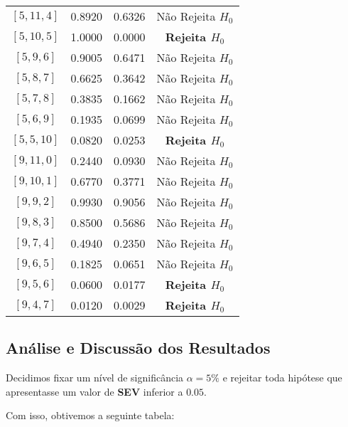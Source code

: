 \documentclass[12pt, a4paper]{article}
\begin{document}
\begin{table}[H]
\begin{tabular}{cccc}
        {$[5, 11, 4]$} & 0.8920 & 0.6326 & Não Rejeita $H_0$ \\
        {$[5, 10, 5]$} & 1.0000 & 0.0000 & \textbf{Rejeita $H_0$} \\
        {$[5, 9, 6]$}  & 0.9005 & 0.6471 & Não Rejeita $H_0$ \\
        {$[5, 8, 7]$}  & 0.6625 & 0.3642 & Não Rejeita $H_0$ \\
        {$[5, 7, 8]$}  & 0.3835 & 0.1662 & Não Rejeita $H_0$ \\
        {$[5, 6, 9]$}  & 0.1935 & 0.0699 & Não Rejeita $H_0$ \\
        {$[5, 5, 10]$} & 0.0820 & 0.0253 & \textbf{Rejeita $H_0$} \\
        \midrule
        {$[9, 11, 0]$} & 0.2440 & 0.0930 & Não Rejeita $H_0$ \\
        {$[9, 10, 1]$} & 0.6770 & 0.3771 & Não Rejeita $H_0$ \\
        {$[9, 9, 2]$}  & 0.9930 & 0.9056 & Não Rejeita $H_0$ \\
        {$[9, 8, 3]$}  & 0.8500 & 0.5686 & Não Rejeita $H_0$ \\
        {$[9, 7, 4]$}  & 0.4940 & 0.2350 & Não Rejeita $H_0$ \\
        {$[9, 6, 5]$}  & 0.1825 & 0.0651 & Não Rejeita $H_0$ \\
        {$[9, 5, 6]$}  & 0.0600 & 0.0177 & \textbf{Rejeita $H_0$} \\
        {$[9, 4, 7]$}  & 0.0120 & 0.0029 & \textbf{Rejeita $H_0$} \\
        \bottomrule
    \end{tabular}
\end{table}

\subsection*{Análise e Discussão dos Resultados}

Decidimos fixar um nível de significância $\alpha = 5\%$ e rejeitar toda hipótese que apresentasse um valor de \textbf{SEV} inferior a $0.05$.

Com isso, obtivemos a seguinte tabela:
\end{document}
